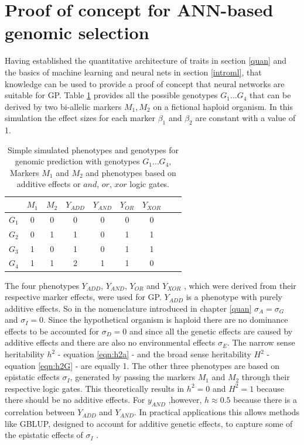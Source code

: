 \section{Proof of concept for ANN-based genomic selection} \label{POC}

Having established the quantitative architecture of traits in section \ref{quan} and the
basics of machine learning and neural nets in section \ref{introml}, that knowledge can be
used to provide a proof of concept that neural networks are suitable for GP. Table
\ref{tab:simmarker} provides all the possible genotypes $G_1 \dots G_4$ that can be
derived by two bi-allelic markers $M_1,M_2$ on a fictional haploid organism. In this
simulation the effect sizes for each marker $\beta_1$ and $\beta_2$ are constant with a
value of 1.

\begin{table}[H]
  \caption[Simple simulated phenotypes for genomic prediction]{Simple simulated phenotypes and genotypes for genomic prediction with genotypes
    $G_1 \dots G_4$, Markers $M_1$ and $M_2$ and phenotypes based on additive effects or
    $and$, $or$, $xor$ logic gates.}
\label{tab:simmarker}
\centering
\begin{tabular}{ l c c | c c c c c c }
  \toprule
  & $M_1$ & $M_2$ & $Y_{ADD}$ & $Y_{AND}$ & $Y_{OR}$ & $Y_{XOR}$\\
  \midrule
  $G_1$ & 0 & 0 & 0 & 0 & 0 & 0 \\
  $G_2$ & 0 & 1 & 1 & 0 & 1 & 1 \\
  $G_3$ & 1 & 0 & 1 & 0 & 1 & 1 \\
  $G_4$ & 1 & 1 & 2 & 1 & 1 & 0 \\
  \bottomrule
\end{tabular}
\end{table}

The four phenotypes $Y_{ADD}$, $Y_{AND}$, $Y_{OR}$ and $Y_{XOR}$ , which were derived from
their respective marker effects, were used for GP. $Y_{ADD}$ is a phenotype with purely
additive effects. So in the nomenclature introduced in chapter \ref{quan}
$\sigma_A = \sigma_G$ and $\sigma_{I} = 0$. Since the hypothetical organism is haploid
there are no dominance effects to be accounted for $\sigma_D = 0$ and since all the
genetic effects are caused by additive effects and there are also no environmental effects
$\sigma_E$.  The narrow sense heritability $h^2$ - equation \ref{eqn:h2a} - and the broad
sense heritability $H^2$ - equation \ref{eqn:h2G} - are equally 1. The other three
phenotypes are based on epistatic effects $\sigma_I$, generated by passing the markers
$M_1$ and $M_2$ through their respective logic gates. This theoretically results in
$h^2 = 0$ and $H^2 = 1$ because there should be no additive effects. For $y_{AND}$
,however, $h \approx 0.5$ because there is a correlation between $Y_{ADD}$ and
$Y_{AND}$. In practical applications this allows methods like GBLUP, designed to account
for additive genetic effects, to capture some of the epistatic effects of $\sigma_I$
\cite{vieira2017assessing}.

